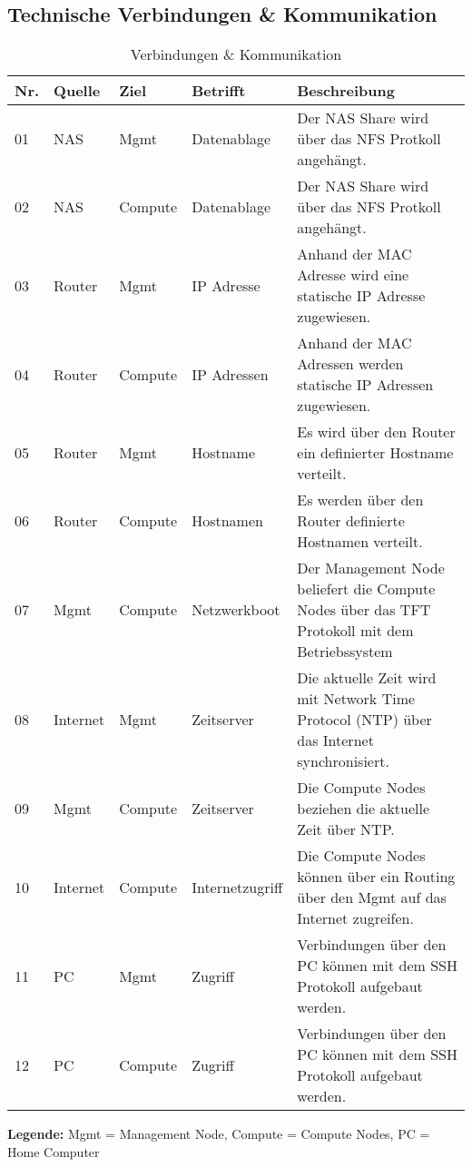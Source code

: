 \subsection{Technische Verbindungen \& Kommunikation}
\begin{table}[H]
\centering
\begin{tabular}{p{1cm}p{1.5cm}p{1.5cm}p{2.2cm}p{8.8cm}}
\hline
\rowcolor{heading} \textbf{Nr.} & \textbf{Quelle} & \textbf{Ziel }& \textbf{Betrifft} & \textbf{Beschreibung} \\\hline
01 & NAS & Mgmt & Datenablage & Der NAS Share wird über das NFS Protkoll angehängt. \\\hline
02 & NAS & Compute & Datenablage & Der NAS Share wird über das NFS Protkoll angehängt. \\\hline
03 & Router & Mgmt & IP Adresse & Anhand der MAC Adresse wird eine statische IP Adresse zugewiesen. \\\hline
04 & Router & Compute & IP Adressen & Anhand der MAC Adressen werden statische IP Adressen zugewiesen. \\\hline
05 & Router & Mgmt &Hostname & Es wird über den Router ein definierter Hostname verteilt. \\\hline
06 & Router & Compute & Hostnamen & Es werden über den Router definierte Hostnamen verteilt. \\\hline
07 & Mgmt & Compute & Netzwerkboot & Der Management Node beliefert die Compute Nodes über das TFT Protokoll mit dem Betriebssystem \\\hline
08 & Internet & Mgmt & Zeitserver & Die aktuelle Zeit wird mit Network Time Protocol (NTP) über das Internet synchronisiert.\\\hline
09 & Mgmt & Compute & Zeitserver & Die Compute Nodes beziehen die aktuelle Zeit über NTP.\\\hline
10 & Internet & Compute & Internetzugriff & Die Compute Nodes können über ein Routing über den Mgmt auf das Internet zugreifen. \\\hline
11 & PC & Mgmt & Zugriff & Verbindungen über den PC können mit dem SSH Protokoll aufgebaut werden. \\\hline
12 & PC & Compute & Zugriff & Verbindungen über den PC können mit dem SSH Protokoll aufgebaut werden. \\\hline
\end{tabular}
\caption{Verbindungen \& Kommunikation}
\end{table}
\textbf{Legende:} Mgmt = Management Node, Compute = Compute Nodes, PC = Home Computer
